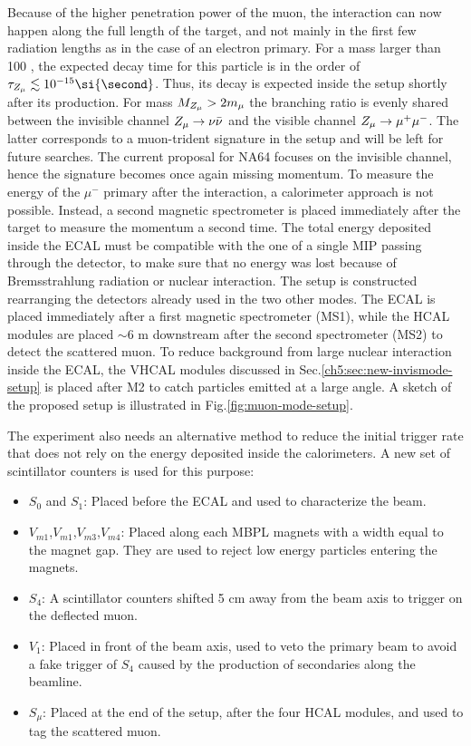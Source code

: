Because of the higher penetration power of the muon, the interaction can now happen along the full length of the target, and not mainly in the first few radiation lengths as in the case of an electron primary.
For a mass larger than 100 \mev, the expected decay time for this particle is in the order of $\tau_{\DMU} \lesssim 10^{-15} \si{\second}$. Thus, its decay is expected inside the setup shortly after its production. For mass $M_{Z_{\mu}} > 2 m_{\mu}$ the branching ratio is evenly shared between the invisible channel $Z_{\mu} \to \nu \bar{\nu}$ and the visible channel $Z_{\mu} \to \mu^+ \mu^-$. The latter corresponds to a muon-trident signature in the setup and will be left for future searches. The current proposal for NA64 focuses on the invisible channel, hence the signature becomes once again missing momentum. To measure the energy of the $\mu^-$ primary after the interaction, a calorimeter approach is not possible. Instead, a second magnetic spectrometer is placed immediately after the target to measure the momentum a second time. The total energy deposited inside the ECAL must be compatible with the one of a single MIP passing through the detector, to make sure that no energy was lost because of Bremsstrahlung radiation or nuclear interaction. The setup is constructed rearranging the detectors already used in the two other modes. The ECAL is placed immediately after a first magnetic spectrometer (MS1), while the HCAL modules are placed $\sim$6 \si{\meter} downstream after the second spectrometer (MS2) to detect the scattered muon. To reduce background from large nuclear interaction inside the ECAL, the VHCAL modules discussed in Sec.\ref{ch5:sec:new-invismode-setup} is placed after M2 to catch particles emitted at a large angle. A sketch of the proposed setup is illustrated in Fig.\ref{fig:muon-mode-setup}.

The experiment also needs an alternative method to reduce the initial trigger rate that does not rely on the energy deposited inside the calorimeters. A new set of scintillator counters is used for this purpose:
\begin{itemize}
\item $S_0$ and $S_1$: Placed before the ECAL and used to characterize the beam.
\item $V_{m1}$,$V_{m1}$,$V_{m3}$,$V_{m4}$: Placed along each MBPL magnets with a width equal to the magnet gap. They are used to reject low energy particles entering the magnets.
\item $S_4$: A scintillator counters shifted 5 \si{\centi\meter} away from the beam axis to trigger on the deflected muon.
\item $V_1$: Placed in front of the beam axis, used to veto the primary beam to avoid a fake trigger of $S_4$ caused by the production of secondaries along the beamline.
\item $S_{\mu}$: Placed at the end of the setup, after the four HCAL modules, and used to tag the scattered muon.
\end{itemize}

